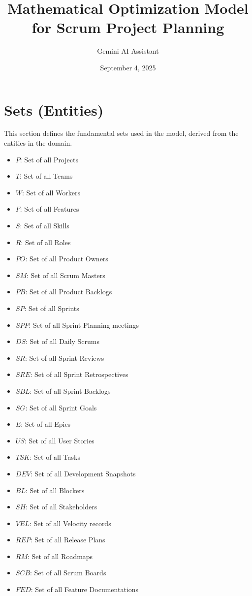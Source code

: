 \documentclass[11pt]{article}
\title{\textbf{Mathematical Optimization Model for Scrum Project Planning}}
\author{Gemini AI Assistant}
\date{September 4, 2025}
\begin{document}
\maketitle
\thispagestyle{empty}

\newpage
\tableofcontents
\thispagestyle{empty}

\newpage
\setcounter{page}{1}

\section{Sets (Entities)}
\label{sec:sets}
This section defines the fundamental sets used in the model, derived from the entities in the domain.

\begin{itemize}
    \item $P$: Set of all Projects
    \item $T$: Set of all Teams
    \item $W$: Set of all Workers
    \item $F$: Set of all Features
    \item $S$: Set of all Skills
    \item $R$: Set of all Roles
    \item $PO$: Set of all Product Owners
    \item $SM$: Set of all Scrum Masters
    \item $PB$: Set of all Product Backlogs
    \item $SP$: Set of all Sprints
    \item $SPP$: Set of all Sprint Planning meetings
    \item $DS$: Set of all Daily Scrums
    \item $SR$: Set of all Sprint Reviews
    \item $SRE$: Set of all Sprint Retrospectives
    \item $SBL$: Set of all Sprint Backlogs
    \item $SG$: Set of all Sprint Goals
    \item $E$: Set of all Epics
    \item $US$: Set of all User Stories
    \item $TSK$: Set of all Tasks
    \item $DEV$: Set of all Development Snapshots
    \item $BL$: Set of all Blockers
    \item $SH$: Set of all Stakeholders
    \item $VEL$: Set of all Velocity records
    \item $REP$: Set of all Release Plans
    \item $RM$: Set of all Roadmaps
    \item $SCB$: Set of all Scrum Boards
    \item $FED$: Set of all Feature Documentations
\end{itemize}
\end{document}
